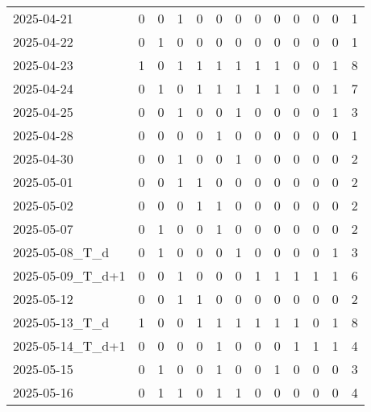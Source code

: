 \documentclass[dvipdfmx,oneside]{article}
\begin{document}
\begin{longtable}{lcccccccccccc}
        2025-04-21 &     0 &     0 &     1 &     0 &     0 &     0 &     0 &     0 &     0 &     0 &     0 &      1 \\
        2025-04-22 &     0 &     1 &     0 &     0 &     0 &     0 &     0 &     0 &     0 &     0 &     0 &      1 \\
        2025-04-23 &     1 &     0 &     1 &     1 &     1 &     1 &     1 &     1 &     0 &     0 &     1 &      8 \\
        2025-04-24 &     0 &     1 &     0 &     1 &     1 &     1 &     1 &     1 &     0 &     0 &     1 &      7 \\
        2025-04-25 &     0 &     0 &     1 &     0 &     0 &     1 &     0 &     0 &     0 &     0 &     1 &      3 \\
        2025-04-28 &     0 &     0 &     0 &     0 &     1 &     0 &     0 &     0 &     0 &     0 &     0 &      1 \\
        2025-04-30 &     0 &     0 &     1 &     0 &     0 &     1 &     0 &     0 &     0 &     0 &     0 &      2 \\
        2025-05-01 &     0 &     0 &     1 &     1 &     0 &     0 &     0 &     0 &     0 &     0 &     0 &      2 \\
        2025-05-02 &     0 &     0 &     0 &     1 &     1 &     0 &     0 &     0 &     0 &     0 &     0 &      2 \\
        2025-05-07 &     0 &     1 &     0 &     0 &     1 &     0 &     0 &     0 &     0 &     0 &     0 &      2 \\
  2025-05-08\_T\_d &     0 &     1 &     0 &     0 &     0 &     1 &     0 &     0 &     0 &     0 &     1 &      3 \\
2025-05-09\_T\_d+1 &     0 &     0 &     1 &     0 &     0 &     0 &     1 &     1 &     1 &     1 &     1 &      6 \\
        2025-05-12 &     0 &     0 &     1 &     1 &     0 &     0 &     0 &     0 &     0 &     0 &     0 &      2 \\
  2025-05-13\_T\_d &     1 &     0 &     0 &     1 &     1 &     1 &     1 &     1 &     1 &     0 &     1 &      8 \\
2025-05-14\_T\_d+1 &     0 &     0 &     0 &     0 &     1 &     0 &     0 &     0 &     1 &     1 &     1 &      4 \\
        2025-05-15 &     0 &     1 &     0 &     0 &     1 &     0 &     0 &     1 &     0 &     0 &     0 &      3 \\
        2025-05-16 &     0 &     1 &     1 &     0 &     1 &     1 &     0 &     0 &     0 &     0 &     0 &      4 \\

\end{longtable}
\end{document}
